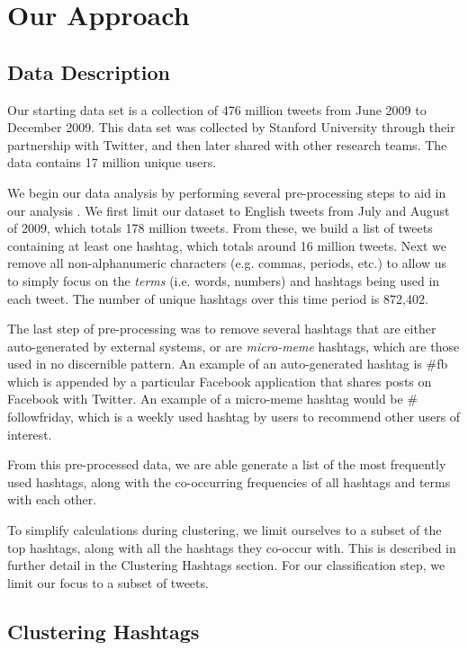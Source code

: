 \section{Our Approach}
\subsection{Data Description}
Our starting data set is a collection of 476 million tweets from June 2009 to December 2009. This data set was collected by Stanford University through their partnership with Twitter, and then later shared with other research teams. The data contains 17 million unique users. 

We begin our data analysis by performing several pre-processing steps to aid in our analysis . We first limit our dataset to English tweets from July and August of 2009, which totals 178 million tweets.  From these, we build a list of tweets containing at least one hashtag, which totals around 16 million tweets.  Next we remove all non-alphanumeric characters (e.g. commas, periods, etc.) to allow us to simply focus on the \emph{terms} (i.e. words, numbers) and hashtags being used in each tweet.  The number of unique hashtags over this time period is 872,402.  

The last step of  pre-processing was to remove several hashtags that are either auto-generated by external systems, or are \emph{micro-meme} hashtags, which are those used in no discernible pattern. An example of an auto-generated hashtag is $\#$fb which is appended by a particular Facebook application that shares posts on Facebook with Twitter. An example of a micro-meme hashtag would be $\#$followfriday, which is a weekly used hashtag by users to recommend other users of interest. 

From this pre-processed data, we are able generate a list of the most frequently used hashtags, along with the co-occurring frequencies of all hashtags and terms with each other. 

To simplify calculations during clustering, we limit ourselves to a subset of the top hashtags, along with all the hashtags they co-occur with. This is described in further detail in the Clustering Hashtags section. For our classification step, we limit our focus to a subset of tweets.


\subsection{Clustering Hashtags}

